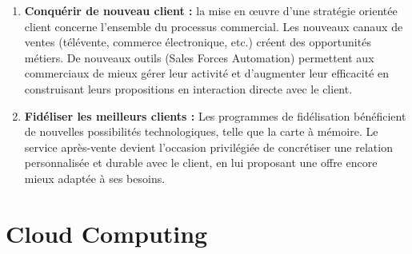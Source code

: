 \documentclass[a4paper, 12pt]{report}
\begin{document}
\begin{itemize}
\begin{enumerate}
\item	 \textbf{Conquérir de nouveau client :} la mise en œuvre d'une stratégie orientée client concerne l'ensemble du processus commercial. Les nouveaux canaux de ventes (télévente, commerce électronique, etc.) créent des opportunités métiers. De nouveaux outils (Sales Forces Automation) permettent aux commerciaux de mieux gérer leur activité et d'augmenter leur efficacité en construisant leurs propositions en interaction directe avec le client. 
\item	\textbf{Fidéliser les meilleurs clients :} Les programmes de fidélisation bénéficient de nouvelles possibilités technologiques, telle que la carte à mémoire. Le service après-vente devient l'occasion privilégiée de concrétiser une relation personnalisée et durable avec le client, en lui proposant une offre encore mieux adaptée à ses besoins.
\end{enumerate}

\section{Cloud Computing}

\end{itemize}
\end{document}
